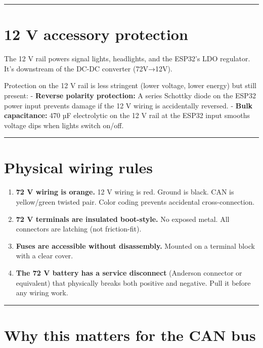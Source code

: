 \documentclass[12pt,a4paper,oneside]{report}
\providecommand{\tightlist}{\setlength{\itemsep}{0pt}\setlength{\parskip}{0pt}}
\begin{document}
\begin{center}\rule{0.5\linewidth}{0.5pt}\end{center}

\section{12 V accessory protection}\label{v-accessory-protection}

The 12 V rail powers signal lights, headlights, and the ESP32's LDO regulator.
It's downstream of the DC-DC converter (72V→12V).

Protection on the 12 V rail is less stringent (lower voltage, lower energy) but
still present: - \textbf{Reverse polarity protection:} A series Schottky diode
on the ESP32 power input prevents damage if the 12 V wiring is accidentally
reversed. - \textbf{Bulk capacitance:} 470 µF electrolytic on the 12 V rail at
the ESP32 input smooths voltage dips when lights switch on/off.

\begin{center}\rule{0.5\linewidth}{0.5pt}\end{center}

\section{Physical wiring rules}\label{physical-wiring-rules}

\begin{enumerate}
\def\labelenumi{\arabic{enumi}.}
\tightlist
\item
  \textbf{72 V wiring is orange.} 12 V wiring is red. Ground is black. CAN is
  yellow/green twisted pair. Color coding prevents accidental cross-connection.
\item
  \textbf{72 V terminals are insulated boot-style.} No exposed metal. All
  connectors are latching (not friction-fit).
\item
  \textbf{Fuses are accessible without disassembly.} Mounted on a terminal block
  with a clear cover.
\item
  \textbf{The 72 V battery has a service disconnect} (Anderson connector or
  equivalent) that physically breaks both positive and negative. Pull it before
  any wiring work.
\end{enumerate}

\begin{center}\rule{0.5\linewidth}{0.5pt}\end{center}

\section{Why this matters for the CAN
bus}\label{why-this-matters-for-the-can-bus}
\end{document}
